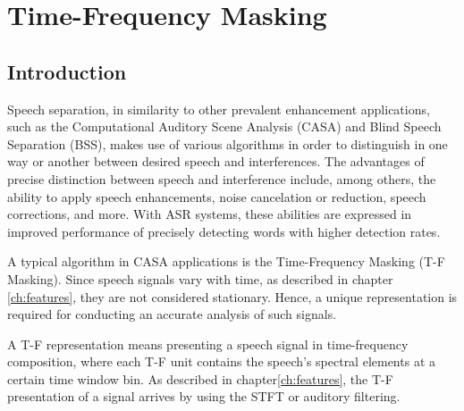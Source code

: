 \chapter{Time-Frequency Masking}
\section{Introduction}
Speech separation, in similarity to other 
prevalent enhancement applications, such as the 
Computational Auditory Scene Analysis (CASA)\cite{BROWN1994297}
and Blind Speech Separation (BSS)\cite{6709849},
makes use of various
algorithms in order to distinguish in one way or another
between desired speech and interferences.
The advantages of precise distinction 
between speech and interference include, among others,
the ability to apply speech enhancements, 
noise cancelation or reduction, speech corrections, and more.
With ASR systems, these abilities are expressed in 
improved performance of precisely detecting words
with higher detection rates.

A typical algorithm in CASA applications is the 
Time-Frequency Masking (T-F Masking). 
Since speech signals vary with time, 
as described in chapter \;\ref{ch:features}, 
they are not considered stationary. 
Hence, a unique representation is required 
for conducting an accurate analysis of such signals. 

A T-F representation means presenting a speech 
signal in time-frequency composition, 
where each T-F unit contains the 
speech's spectral elements at a certain time window bin. 
As described in chapter\;\ref{ch:features}, 
the T-F presentation of a signal 
arrives by using the STFT or auditory filtering\cite{Xia2017UsingOR}.

